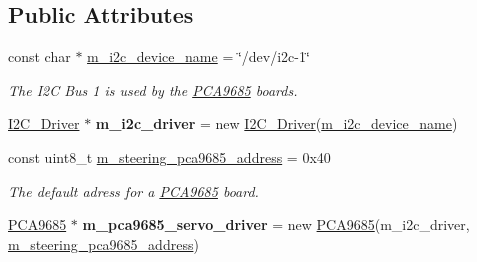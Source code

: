 \subsection*{Public Attributes}
\begin{DoxyCompactItemize}
\item 
\mbox{\label{classfennec__ns_1_1_fennec_h_w_interface_a9e450fc1f1b96701f89be637a58622a9}} 
const char $\ast$ \hyperlink{classfennec__ns_1_1_fennec_h_w_interface_a9e450fc1f1b96701f89be637a58622a9}{m\+\_\+i2c\+\_\+device\+\_\+name} = \char`\"{}/dev/i2c-\/1\char`\"{}
\begin{DoxyCompactList}\small\item\em The I2C Bus 1 is used by the \hyperlink{class_p_c_a9685}{P\+C\+A9685} boards. \end{DoxyCompactList}\item 
\mbox{\label{classfennec__ns_1_1_fennec_h_w_interface_a62c8cef371f076986ead0942304d134c}} 
\hyperlink{class_i2_c___driver}{I2\+C\+\_\+\+Driver} $\ast$ {\bfseries m\+\_\+i2c\+\_\+driver} = new \hyperlink{class_i2_c___driver}{I2\+C\+\_\+\+Driver}(\hyperlink{classfennec__ns_1_1_fennec_h_w_interface_a9e450fc1f1b96701f89be637a58622a9}{m\+\_\+i2c\+\_\+device\+\_\+name})
\item 
\mbox{\label{classfennec__ns_1_1_fennec_h_w_interface_aad562b8627b08e5dfdda168ade82530d}} 
const uint8\+\_\+t \hyperlink{classfennec__ns_1_1_fennec_h_w_interface_aad562b8627b08e5dfdda168ade82530d}{m\+\_\+steering\+\_\+pca9685\+\_\+address} = 0x40
\begin{DoxyCompactList}\small\item\em The default adress for a \hyperlink{class_p_c_a9685}{P\+C\+A9685} board. \end{DoxyCompactList}\item 
\mbox{\label{classfennec__ns_1_1_fennec_h_w_interface_af8ebee84c63d1be3c949d58ab6087dbc}} 
\hyperlink{class_p_c_a9685}{P\+C\+A9685} $\ast$ {\bfseries m\+\_\+pca9685\+\_\+servo\+\_\+driver} = new \hyperlink{class_p_c_a9685}{P\+C\+A9685}(m\+\_\+i2c\+\_\+driver, \hyperlink{classfennec__ns_1_1_fennec_h_w_interface_aad562b8627b08e5dfdda168ade82530d}{m\+\_\+steering\+\_\+pca9685\+\_\+address})
\item 

\end{DoxyCompactItemize}

